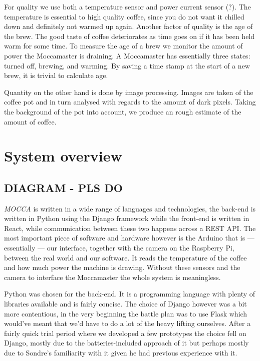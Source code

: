 \documentclass[12pt,a4paper,oneside,article]{memoir}
\numberwithin{equation}{chapter}
\begin{document}
For quality we use both a temperature sensor 
and power current sensor (?). The temperature is essential to high quality 
coffee, since you do not want it chilled down and definitely not warmed 
up again. Another factor of quality is the age of the brew. The good taste of 
coffee deteriorates as time goes on if it has been held warm for some time. To 
measure the age of a brew we monitor the amount of power the Moccamaster is 
draining. A Moccamaster has essentially three states: turned off, brewing, 
and warming. By saving a time stamp at the start of a new brew, it is trivial 
to calculate age.

Quantity on the other hand is done by image processing. Images are taken of the 
coffee pot and in turn analysed with regards to the amount of dark pixels. 
Taking the background of the pot into account, we produce an rough estimate of 
the amount of coffee. 


\section{System overview}\label{sec:technical-details}

\subsection{DIAGRAM - PLS DO}
\textit{MOCCA} is written in a wide range of languages and technologies, the
back-end is written in Python using the Django framework while the front-end is
written in React, while communication between these two happens across a REST
API.
The most important piece of software and hardware however is the Arduino
that is --- essentially --- our interface, together with the camera on the 
Raspberry Pi, between the real world and our software. It reads the temperature 
of the coffee and how much power the machine is drawing. Without these sensors 
and the camera to interface the Moccamaster the whole system is meaningless. 

Python was chosen for the back-end. It is a programming language with plenty of 
libraries available and is fairly concise. The choice of Django however was a 
bit more contentious, in the very beginning the battle plan was to use Flask 
which would've meant that we'd have to do a lot of the heavy lifting ourselves.
After a fairly quick trial period where we developed a few prototypes the choice
fell on Django, mostly due to the batteries-included approach of it but perhaps
mostly due to Sondre's familiarity with it given he had previous experience with
it.
\end{document}
